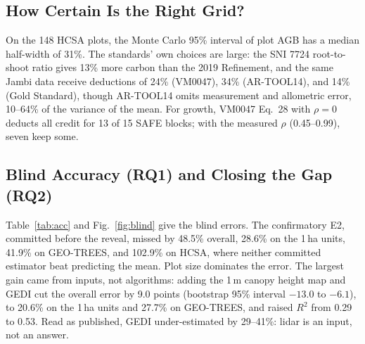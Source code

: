 \documentclass[conference,a4paper]{IEEEtran}
\begin{document}
\subsection{How Certain Is the Right Grid?}
On the 148 HCSA plots, the Monte Carlo 95\% interval of plot AGB has a median half-width of 31\%. The standards' own choices are large: the SNI 7724 root-to-shoot ratio gives 13\% more carbon than the 2019 Refinement, and the same Jambi data receive deductions of 24\% (VM0047), 34\% (AR-TOOL14), and 14\% (Gold Standard), though AR-TOOL14 omits measurement and allometric error, 10--64\% of the variance of the mean. For growth, VM0047 Eq.~28 with $\rho=0$ deducts all credit for 13 of 15 SAFE blocks; with the measured $\rho$ (0.45--0.99), seven keep some.

\subsection{Blind Accuracy (RQ1) and Closing the Gap (RQ2)}
Table~\ref{tab:acc} and Fig.~\ref{fig:blind} give the blind errors. The confirmatory E2, committed before the reveal, missed by 48.5\% overall, 28.6\% on the 1\,ha units, 41.9\% on GEO-TREES, and 102.9\% on HCSA, where neither committed estimator beat predicting the mean. Plot size dominates the error. The largest gain came from inputs, not algorithms: adding the 1\,m canopy height map and GEDI cut the overall error by 9.0 points (bootstrap 95\% interval $-13.0$ to $-6.1$), to 20.6\% on the 1\,ha units and 27.7\% on GEO-TREES, and raised $R^2$ from 0.29 to 0.53. Read as published, GEDI under-estimated by 29--41\%: lidar is an input, not an answer.
\end{document}
